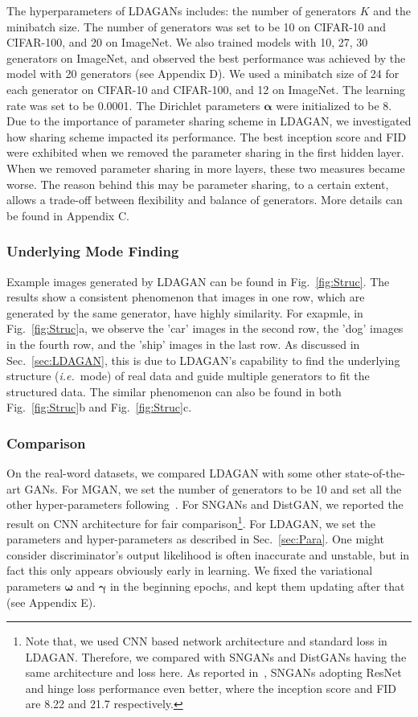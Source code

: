 \documentclass{article}
\def\ie{\emph{i.e.}}
\begin{document}
The hyperparameters of LDAGANs includes: the number of generators $K$ and the minibatch size.
The number of generators was set to be 10 on CIFAR-10 and CIFAR-100, and 20 on ImageNet.
We also trained models with 10, 27, 30 generators on ImageNet, and observed the best performance was achieved by the model with 20 generators (see  Appendix D).
We used a minibatch size of 24 for each generator on CIFAR-10 and CIFAR-100, and 12 on ImageNet.
The learning rate was set to be 0.0001.
The Dirichlet parameters $\bm{\alpha}$ were initialized to be 8.
Due to the importance of parameter sharing scheme in LDAGAN, we investigated how sharing scheme impacted its performance.
The best inception score and FID were exhibited when we removed the parameter sharing in the first hidden layer.
When we removed parameter sharing in more layers, these two measures became worse.
The reason behind this may be parameter sharing, to a certain extent, allows a trade-off between flexibility and balance of generators.
More details can be found in Appendix C.



\subsubsection{Underlying Mode Finding}
\label{sec:Struc}

Example images generated by LDAGAN can be found in Fig.~\ref{fig:Struc}.
The results show a consistent phenomenon that images in one row, which are generated by the same generator, have highly similarity.
For exapmle, in Fig.~\ref{fig:Struc}a, we observe the 'car' images in the second row, the 'dog' images in the fourth row, and the 'ship' images in the last row.
As discussed in Sec.~\ref{sec:LDAGAN}, this is due to LDAGAN's capability to find the underlying structure (\ie~mode) of real data and guide multiple generators to fit the structured data.
The similar phenomenon can also be found in both Fig.~\ref{fig:Struc}b and Fig.~\ref{fig:Struc}c.

\subsubsection{Comparison}
\label{sec:Comp}


On the real-word datasets, we compared LDAGAN with some other state-of-the-art GANs.
For MGAN, we set the number of generators to be 10 and set all the other hyper-parameters following~\cite{hoang2018mgan}.
For SNGANs and DistGAN, we reported the result on CNN architecture for fair comparison\footnote[1]{Note that, we used CNN based network architecture and standard loss in LDAGAN. Therefore, we compared with SNGANs and DistGANs having the same architecture and loss here. As reported in~\cite{miyato2018spectral}, SNGANs adopting ResNet and hinge loss performance even better, where the inception score and FID are 8.22 and 21.7 respectively.}.
For LDAGAN, we set the parameters and hyper-parameters as described in Sec.~\ref{sec:Para}.
One might consider discriminator's output likelihood is often inaccurate and unstable, but in fact this only appears obviously early in learning.
We fixed the variational parameters $\bm{\omega}$ and $\bm{\gamma}$ in the beginning epochs, and kept them updating after that (see Appendix E).
\end{document}
